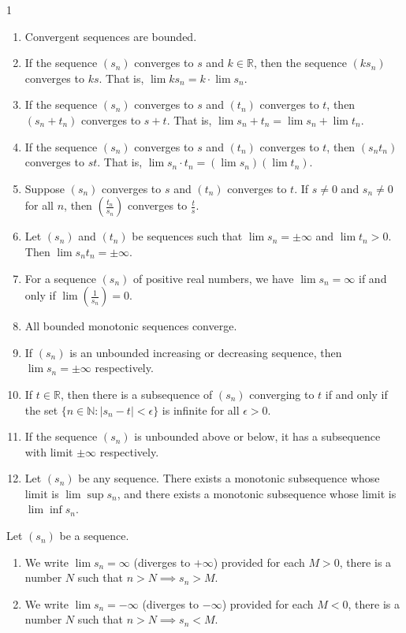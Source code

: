\begin{theo}{1}
	\begin{enumerate}[i]
		\item Convergent sequences are bounded.
		\item If the sequence $(s_n)$ converges to $s$ and $k\in\mathbb{R}$, then the sequence $(ks_n)$ converges to $ks$. That is, $\lim ks_n=k\cdot \lim s_n$.
		\item If the sequence $(s_n)$ converges to $s$ and $(t_n)$ converges to $t$, then $(s_n+t_n)$ converges to $s+t$. That is, $\lim s_n+t_n=\lim s_n+\lim t_n$.
		\item If the sequence $(s_n)$ converges to $s$ and $(t_n)$ converges to $t$, then $(s_n t_n)$ converges to $st$. That is, $\lim s_n\cdot t_n=(\lim s_n)(\lim t_n)$.
		\item Suppose $(s_n)$ converges to $s$ and $(t_n)$ converges to $t$. If $s \neq 0$ and
		$s_n \neq 0$ for all $n$, then $(\frac{t_n}{s_n})$ converges to $\frac{t}{s}$.		
		\item Let $(s_n)$ and $(t_n)$ be sequences such that $\lim s_n=\pm\infty$ and $\lim t_n > 0$. Then $\lim s_n t_n = \pm\infty$.
		\item For a sequence $(s_n)$ of positive real numbers, we have $\lim s_n = \infty$
		if and only if $\lim(\frac{1}{s_n}) = 0$.
		\item All bounded monotonic sequences converge.
		\item If $(s_n)$ is an unbounded increasing or decreasing sequence, then $\lim s_n = \pm\infty$ respectively.
		\item If $t \in \mathbb{R}$, then there is a subsequence of $(s_n)$ converging to $t$ if and only if the set $\{n \in \mathbb{N} : |s_n - t| < \epsilon\}$ is infinite for all $\epsilon > 0$.
		\item If the sequence $(s_n)$ is unbounded above or below, it has a subsequence with limit $\pm \infty$ respectively.
		\item Let $(s_n)$ be any sequence. There exists a monotonic subsequence	whose limit is $\lim \sup s_n$, and there exists a monotonic subsequence	whose limit is $\lim \inf s_n$.
	\end{enumerate}
\end{theo}


\begin{defn}{1}
	Let $(s_n)$ be a sequence.
	\begin{enumerate}[i]
		\item We write $\lim s_n = \infty$ (diverges to $+\infty$) provided for each $M>0$, there is a number $N$ such that $n>N \implies s_n>M$.
		\item We write $\lim s_n = -\infty$ (diverges to $-\infty$) provided for each $M<0$, there is a number $N$ such that $n>N \implies s_n<M$.
	\end{enumerate}	
\end{defn}

